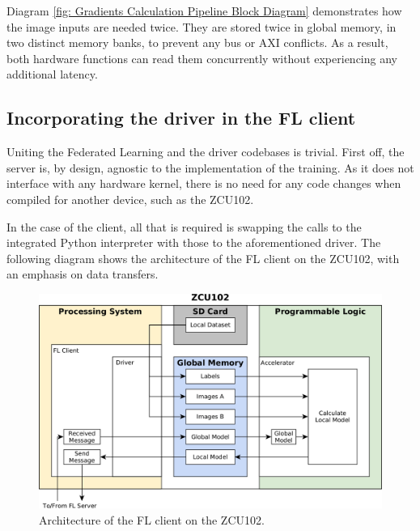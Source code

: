 Diagram \ref{fig: Gradients Calculation Pipeline Block Diagram} demonstrates how the image inputs are needed twice. They are stored twice in global memory, in two distinct memory banks, to prevent any bus or AXI conflicts. As a result, both hardware functions can read them concurrently without experiencing any additional latency. %

\subsection{Incorporating the driver in the FL client}
Uniting the Federated Learning and the driver codebases is trivial. First off, the server is, by design, agnostic to the implementation of the training. As it does not interface with any hardware kernel, there is no need for any code changes when compiled for another device, such as the ZCU102.

In the case of the client, all that is required is swapping the calls to the integrated Python interpreter with those to the aforementioned driver. The following diagram shows the architecture of the FL client on the ZCU102, with an emphasis on data transfers.

\begin{figure}[H]
    \centering
        \includegraphics[width=\textwidth]{Images/block_diagrams/zcu_FL_client.png}
        \decoRule
        \caption[ZCU102 FL client]{Architecture of the FL client on the ZCU102.}
        \label{fig: ZCU102 FL client}
\end{figure}